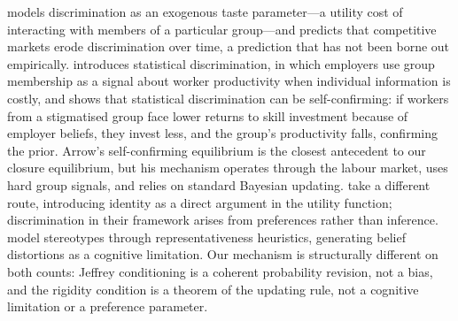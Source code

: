 \documentclass[12pt,a4paper]{article}
\theoremstyle{definition}
\numberwithin{proposition}{subsection}
\begin{document}
\citet{Becker1957} models discrimination as an exogenous taste
parameter---a utility cost of interacting with members of a
particular group---and predicts that competitive markets erode
discrimination over time, a prediction that has not been borne out
empirically. \citet{Phelps1972} introduces statistical
discrimination, in which employers use group membership as a signal
about worker productivity when individual information is costly, and
\citet{Arrow1973} shows that statistical discrimination can be
self-confirming: if workers from a stigmatised group face lower
returns to skill investment because of employer beliefs, they
invest less, and the group's productivity falls, confirming the
prior. Arrow's self-confirming equilibrium is the closest antecedent
to our closure equilibrium, but his mechanism operates through the
labour market, uses hard group signals, and relies on standard
Bayesian updating. \citet{AkerlofKranton2000} take a different route,
introducing identity as a direct argument in the utility function;
discrimination in their framework arises from preferences rather than
inference. \citet{BordaloEtal2016} model stereotypes through
representativeness heuristics, generating belief distortions as a
cognitive limitation. Our mechanism is structurally different on both
counts: Jeffrey conditioning is a coherent probability revision, not
a bias, and the rigidity condition is a theorem of the updating rule,
not a cognitive limitation or a preference parameter.
\end{document}
